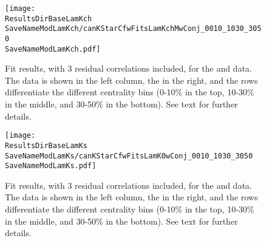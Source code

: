 \documentclass[/home/jesse/Analysis/FemtoAnalysis/AnalysisNotes/AnalysisNoteJBuxton.tex]{subfiles}
\renewcommand{\NonFlatBgdLamKch}{_NonFlatBgdCrctnLamK0LinearLamKchPolynomial}
\renewcommand{\NonFlatBgdLamKs}{_NonFlatBgdCrctnLamK0LinearLamKchPolynomial}
\renewcommand{\ResNum}{_3Res}
\renewcommand{\PrimMaxDecay}{_PrimMaxDecay10fm}
\renewcommand{\SaveNameModLamKch}{\MomRes\NonFlatBgdLamKch\ResNum\PrimMaxDecay\ResMethod\ParamFixAndShareLamKch}
\renewcommand{\SaveNameModLamKs}{\MomRes\NonFlatBgdLamKs\ResNum\PrimMaxDecay\ResMethod\ParamFixAndShareLamKch}
\begin{document}
\begin{figure}[h!]
  \centering
  \texttt{[image: \\ResultsDirBaseLamKch\\SaveNameModLamKch/canKStarCfwFitsLamKchMwConj\_0010\_1030\_3050\\SaveNameModLamKch.pdf]}
  \caption[\LamKchMALamKchP data with fits]
  {
  Fit results, with 3 residual correlations included, for the \LamKchM and \ALamKchP data.
  The \LamKchM data is shown in the left column, the \ALamKchP in the right, and the rows differentiate the different centrality bins (0-10\% in the top, 10-30\% in the middle, and 30-50\% in the bottom).
 See text for further details.
 }
  \label{fig:LamKchMwConjFits_3Res}
\end{figure}


\begin{figure}[h!]
  \centering
  \texttt{[image: \\ResultsDirBaseLamKs\\SaveNameModLamKs/canKStarCfwFitsLamK0wConj\_0010\_1030\_3050\\SaveNameModLamKs.pdf]}
  \caption[\LamALamKs data with fits]
  {
  Fit results, with 3 residual correlations included, for the \LamKs and \ALamKs data.
  The \LamKs data is shown in the left column, the \ALamKs in the right, and the rows differentiate the different centrality bins (0-10\% in the top, 10-30\% in the middle, and 30-50\% in the bottom).
 See text for further details.
 }
  \label{fig:LamK0wConjFits_3Res}
\end{figure}

\clearpage
\end{document}
